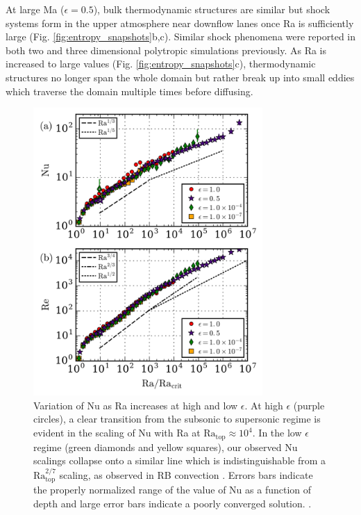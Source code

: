 \documentclass[aps, prl, twocolumn, nofootinbib, groupedaddress, amsfonts, amssymb, amsmath]{revtex4-1}
\begin{document}
At large Ma ($\epsilon = 0.5$), bulk thermodynamic structures are similar but
shock systems form in the upper atmosphere near downflow lanes 
once Ra is sufficiently large  (Fig. \ref{fig:entropy_snapshots}b,c).
Similar shock phenomena were reported in
both two \cite{cattaneo&all1990} and 
three \cite{malagoli&all1990} dimensional polytropic simulations previously.
As Ra is increased to large values 
(Fig. \ref{fig:entropy_snapshots}c), thermodynamic structures 
no longer span the whole domain but rather break up into 
small eddies which traverse the domain multiple
times before diffusing.  

\begin{figure}[t]
\includegraphics[width=3.4375in]{./figs/re_and_nu_v_Ra.png}
\caption{
Variation of Nu as Ra increases at high and low $\epsilon$. 
At high $\epsilon$ (purple circles), 
a clear transition from the subsonic to supersonic regime 
is evident in the scaling
of Nu with Ra at $\text{Ra}_{\text{top}} \approx 10^4$.  
In the low $\epsilon$ regime (green diamonds and yellow squares), 
our observed Nu scalings collapse onto a similar line which is
indistinguishable from a $\text{Ra}_{\text{top}}^{2/7}$ scaling, 
as observed in RB convection \cite{johnston&doering2009}.  
Errors bars indicate the properly normalized range of the
value of Nu as a function of depth and
large error bars indicate a poorly converged solution.
 \label{fig:re_and_nu_v_ra}.
}
\end{figure}
\end{document}
